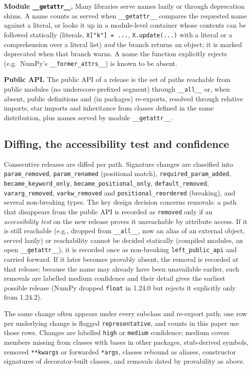 \documentclass[10pt,twocolumn,letterpaper]{article}
\begin{document}
\textbf{Module \texttt{\_\_getattr\_\_}.} Many libraries serve names lazily or through deprecation shims. A name counts
as served when \texttt{\_\_getattr\_\_} compares the requested name against a literal, or looks it up in a module-level
container whose contents can be followed statically (literals, \texttt{X["k"] = ...}, \texttt{X.update(...)} with a
literal or a comprehension over a literal list) \emph{and} the branch returns an object; it is marked deprecated when
that branch warns. A name the function explicitly rejects (e.g.\ NumPy's \texttt{\_\_former\_attrs\_\_}) is known to
be absent.

\textbf{Public API.} The public API of a release is the set of paths reachable from public modules (no
underscore-prefixed segment) through \texttt{\_\_all\_\_} or, when absent, public definitions and (in packages)
re-exports, resolved through relative imports, star imports and inheritance from classes defined in the same
distribution, plus names served by module \texttt{\_\_getattr\_\_}.

\subsection{Diffing, the accessibility test and confidence}
Consecutive releases are diffed per path. Signature changes are classified into \texttt{param\_removed},
\texttt{param\_renamed} (positional match), \texttt{required\_param\_added}, \texttt{became\_keyword\_only},
\texttt{became\_positional\_only}, \texttt{default\_removed}, \texttt{vararg\_removed}, \texttt{varkw\_removed} and
\texttt{positional\_reordered} (breaking), and several non-breaking types. The key design decision concerns removals:
a path that disappears from the public API is recorded as \texttt{removed} only if an \emph{accessibility test} on
the new release proves it unreachable by attribute access. If it is still reachable (e.g., dropped from
\texttt{\_\_all\_\_}, now an alias of an external object, served lazily) or reachability cannot be decided statically
(compiled modules, an open \texttt{\_\_getattr\_\_}), it is recorded once as non-breaking \texttt{left\_public\_api} and
carried forward. If it later becomes provably absent, the removal is recorded at that release; because the name may
already have been unavailable earlier, such removals are labelled medium confidence and their detail gives the earliest
possible release (NumPy dropped \texttt{float} in 1.24.0 but rejects it explicitly only from 1.24.2).

The same change often appears under every subclass and re-export path; one row per underlying change is flagged
\texttt{representative}, and counts in this paper use those rows. Changes are labelled \texttt{high} or
\texttt{medium} confidence; medium covers members missing from classes with bases in other packages, stub-derived
symbols, removed \texttt{**kwargs} or forwarded \texttt{*args}, classes rebound as aliases, constructor signatures of
decorator-built classes, and removals dated by provability as above.
\end{document}
